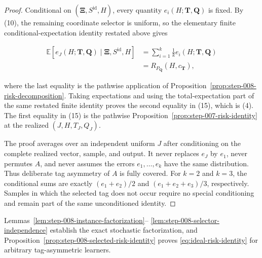 \begin{proof}
Conditional on \((\boldsymbol\Xi,S^{\mathrm{id}},H)\), every quantity
\(e_i(H;\boldsymbol T,\boldsymbol Q)\) is fixed. By (10), the remaining
coordinate selector is uniform, so the elementary finite
conditional-expectation identity restated above gives

\[
\begin{aligned}
\mathbb E\!\left[
e_J(H;\boldsymbol T,\boldsymbol Q)
\mid\boldsymbol\Xi,S^{\mathrm{id}},H
\right]
&=\sum_{i=1}^k\frac1k
  e_i(H;\boldsymbol T,\boldsymbol Q)\\
&=R_{P_{\boldsymbol Q}}(H,c_{\boldsymbol T}),
\end{aligned}
\]

where the last equality is the pathwise application of
Proposition~\ref{prop:step-008-risk-decomposition}. Taking expectations and
using the total-expectation part of the same restated finite identity proves
the second equality in (15), which is (4). The first equality in (15) is the
pathwise Proposition~\ref{prop:step-007-risk-identity} at the realized
\((J,H,T_J,Q_J)\).

The proof averages over an independent uniform \(J\) after conditioning on
the complete realized vector, sample, and output. It never replaces
\(e_J\) by \(e_1\), never permutes \(A\), and never assumes the errors
\(e_1,\ldots,e_k\) have the same distribution. Thus deliberate tag
asymmetry of \(A\) is fully covered. For \(k=2\) and \(k=3\), the
conditional sums are exactly \((e_1+e_2)/2\) and
\((e_1+e_2+e_3)/3\), respectively. Samples in which the selected tag does
not occur require no special conditioning and remain part of the same
unconditioned identity. \end{proof}
Lemmas~\ref{lem:step-008-instance-factorization}--
\ref{lem:step-008-selector-independence} establish the exact stochastic
factorization, and
Proposition~\ref{prop:step-008-selected-risk-identity} proves
\eqref{eq:ideal-risk-identity} for arbitrary tag-asymmetric learners.

